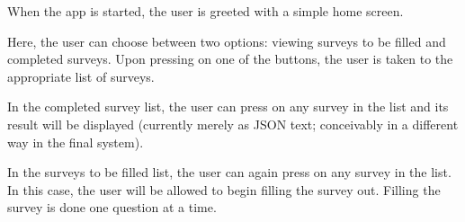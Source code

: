 When the app is started, the user is greeted with a simple home screen.

Here, the user can choose between two options: viewing surveys to be filled and completed surveys. Upon pressing on one of the buttons, the user is taken to the appropriate list of surveys.

In the completed survey list, the user can press on any survey in the list and its result will be displayed (currently merely as JSON text; conceivably in a different way in the final system).

In the surveys to be filled list, the user can again press on any survey in the list. In this case, the user will be allowed to begin filling the survey out. Filling the survey is done one question at a time.
